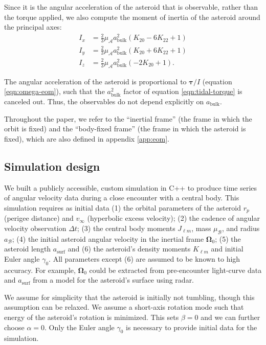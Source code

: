 \documentclass[fleqn,usenatbib]{mnras}
\newcommand{\parens}[1]{\left( #1 \right)}
\begin{document}
Since it is the angular acceleration of the asteroid that is observable, rather than the torque applied, we also compute the moment of inertia of the asteroid around the principal axes: 
\begin{equation}
  \begin{split}
    I_x &= \frac{2}{3}\mu_\mathcal{A} a_\text{bulk}^2 \parens{K_{20} - 6 K_{22} + 1}\\
    I_y &= \frac{2}{3}\mu_\mathcal{A} a_\text{bulk}^2 \parens{K_{20} + 6 K_{22} + 1}\\
    I_z &= \frac{2}{3}\mu_\mathcal{A} a_\text{bulk}^2 \parens{-2K_{20} + 1}.
  \end{split}
  \label{eqn:moi}
\end{equation}

The angular acceleration of the asteroid is proportional to $\bm \tau / I$ (equation \ref{eqn:omega-eom}), such that the $a_\text{bulk}^2$ factor of equation \ref{eqn:tidal-torque} is canceled out. Thus, the observables do not depend explicitly on $a_\text{bulk}$.

Throughout the paper, we refer to the ``inertial frame'' (the frame in which the orbit is fixed) and the ``body-fixed frame'' (the frame in which the asteroid is fixed), which are also defined in appendix \ref{app:eom}.

\subsection{Simulation design}
\label{sec:sim}

We built a publicly accessible, custom simulation in C++ to produce time series of angular velocity data during a close encounter with a central body. This simulation requires as initial data (1) the orbital parameters of the asteroid $r_p$ (perigee distance) and $v_\infty$ (hyperbolic excess velocity); (2) the cadence of angular velocity observation $\Delta t$; (3) the central body moments $J_{\ell m}$, mass $\mu_\mathcal{B}$, and radius $a_\mathcal{B}$; (4) the initial asteroid angular velocity in the inertial frame $\bm \Omega_0$; (5) the asteroid length $a_\text{surf}$ and (6) the asteroid's density moments $K_{\ell m}$ and initial Euler angle $\gamma_0$. All parameters except (6) are assumed to be known to high accuracy. For example, $\bm \Omega_0$ could be extracted from pre-encounter light-curve data and $a_\text{surf}$ from a model for the asteroid's surface using radar.

We assume for simplicity that the asteroid is initially not tumbling, though this assumption can be relaxed. We assume a short-axis rotation mode such that energy of the asteroid's rotation is minimized. This sets $\beta = 0$ and we can further choose $\alpha = 0$. Only the Euler angle $\gamma_0$ is necessary to provide initial data for the simulation.
\end{document}
